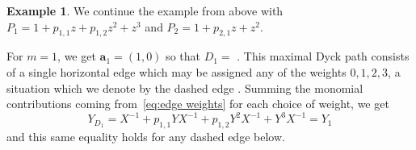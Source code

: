\documentclass[10pt]{amsart}
\theoremstyle{definition}
\newtheorem{example}[theorem]{Example}
\newcommand{\bfa}{\mathbf{a}}
\begin{document}
 \begin{example}
 We continue the example from above with $P_1=1+p_{1,1}z+p_{1,2}z^2+z^3$ and $P_2=1+p_{2,1}z+z^2$.
 
 For $m=1$, we get $\bfa_1=(1,0)$ so that $D_1=$ 
 .
 This maximal Dyck path consists of a single horizontal edge which may be assigned any of the weights $0,1,2,3$, a situation which we denote by the dashed edge
 .
 Summing the monomial contributions coming from~\eqref{eq:edge weights} for each choice of weight, we get
 \[Y_{D_1}=X^{-1}+p_{1,1}YX^{-1}+p_{1,2}Y^2X^{-1}+Y^3X^{-1}=Y_1\]
 and this same equality holds for any dashed edge below.


\end{example}
\end{document}
